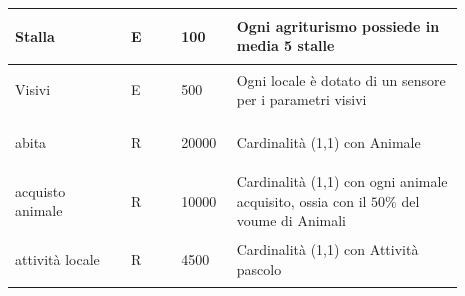 \documentclass[12pt,a4paper]{article}
\begin{document}
\begin{center}
\begin{longtable}{|p{0.23\linewidth}|p{0.1\linewidth}|p{0.11\linewidth}|p{0.45\linewidth}|}
\hline
Stalla 				& \begin{center}
\vspace{-25pt}E
\end{center}
					& \begin{center}
					\vspace{-25pt}100\end{center}
					&  Ogni agriturismo possiede in media 5 stalle \\ 

\hline
Visivi 				& \begin{center}
\vspace{-25pt}E
\end{center}
					& \begin{center}
					\vspace{-25pt}500\end{center}
					&  Ogni locale è dotato di un sensore per i parametri visivi \\ 

\hline
abita 				& \begin{center}
\vspace{-25pt}R
\end{center}
					& \begin{center}
					\vspace{-25pt}20000\end{center}
					&  Cardinalità (1,1) con Animale \\ 

\hline
acquisto animale 				& \begin{center}
\vspace{-25pt}R
\end{center}
					& \begin{center}
					\vspace{-25pt}10000\end{center}
					&  Cardinalità (1,1) con ogni animale acquisito, ossia con il $50\%$ del voume di Animali \\ 

\hline
%
attività locale 				& \begin{center}
\vspace{-25pt}R
\end{center}
					& \begin{center}
					\vspace{-25pt}4500\end{center}
					&  Cardinalità (1,1) con Attività pascolo \\ 


\end{longtable}
\end{center}
\end{document}
